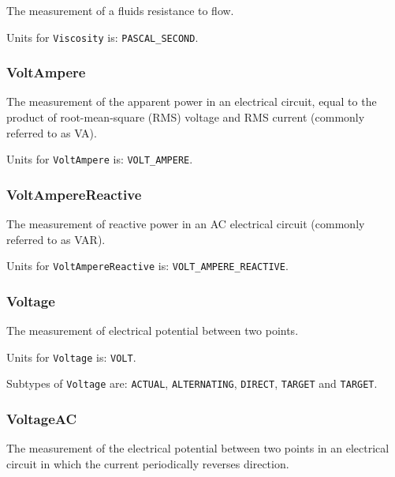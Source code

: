 The measurement of a fluids resistance to flow.


Units for \texttt{Viscosity} is: \texttt{PASCAL_SECOND}.

\FloatBarrier

\subsubsection{VoltAmpere}
  \label{sec:VoltAmpere}



The measurement of the apparent power in an electrical circuit, equal to the product of root-mean-square (RMS) voltage and RMS current (commonly referred to as VA).


Units for \texttt{VoltAmpere} is: \texttt{VOLT_AMPERE}.

\FloatBarrier

\subsubsection{VoltAmpereReactive}
  \label{sec:VoltAmpereReactive}



The measurement of reactive power in an AC electrical circuit (commonly referred to as VAR).


Units for \texttt{VoltAmpereReactive} is: \texttt{VOLT_AMPERE_REACTIVE}.

\FloatBarrier

\subsubsection{Voltage}
  \label{sec:Voltage}



The measurement of electrical potential between two points.


Units for \texttt{Voltage} is: \texttt{VOLT}.


Subtypes of \texttt{Voltage} are: \texttt{ACTUAL}, \texttt{ALTERNATING}, \texttt{DIRECT}, \texttt{TARGET} and \texttt{TARGET}. 
\FloatBarrier

\subsubsection{VoltageAC}
  \label{sec:VoltageAC}



The measurement of the electrical potential between two points in an electrical circuit in which the current periodically reverses direction.


